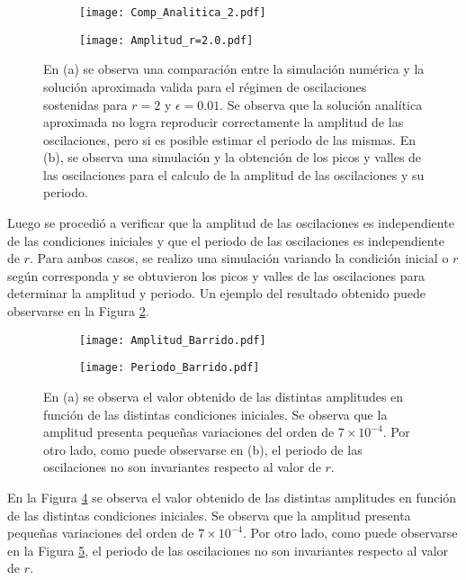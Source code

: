 \begin{figure}[h!]
    \centering
    \begin{subfigure}[b]{0.48\textwidth}
        \texttt{[image: Comp\_Analitica\_2.pdf]}
        \caption{}
        \label{02_Comp_Analitica}
    \end{subfigure}
    \hfill
    \begin{subfigure}[b]{0.48\textwidth}
        \texttt{[image: Amplitud\_r=2.0.pdf]}
        \caption{}
        \label{02_Picos}
    \end{subfigure}
    \caption{En (a) se observa una comparación entre la simulación numérica y la solución aproximada valida para el régimen de oscilaciones sostenidas para $r=2$ y $\epsilon=0.01$. Se observa que la solución analítica aproximada no logra reproducir correctamente la amplitud de las oscilaciones, pero si es posible estimar el periodo de las mismas. En (b), se observa una simulación y la obtención de los picos y valles de las oscilaciones para el calculo de la amplitud de las oscilaciones y su periodo.}
    \label{02_ejercicio_2}
\end{figure}

Luego se procedió a verificar que la amplitud de las oscilaciones es independiente de las condiciones iniciales y que el periodo de las oscilaciones es independiente de $r$. Para ambos casos, se realizo una simulación variando la condición inicial o $r$ según corresponda y se obtuvieron los picos y valles de las oscilaciones para determinar la amplitud y periodo. Un ejemplo del resultado obtenido puede observarse en la Figura \ref{02_Picos}.

\begin{figure}[h!]
    \centering
    \begin{subfigure}[b]{0.48\textwidth}
        \texttt{[image: Amplitud\_Barrido.pdf]}
        \caption{}
        \label{02_Barrido_CI}
    \end{subfigure}
    \hfill
    \begin{subfigure}[b]{0.48\textwidth}
        \texttt{[image: Periodo\_Barrido.pdf]}
        \caption{}
        \label{02_Barrido_r}
    \end{subfigure}
    \caption{En (a) se observa el valor obtenido de las distintas amplitudes en función de las distintas condiciones iniciales. Se observa que la amplitud presenta pequeñas variaciones del orden de $7\times 10^{-4}$. Por otro lado, como puede observarse en (b), el periodo de las oscilaciones no son invariantes respecto al valor de $r$.}
    \label{02_Resutados_Barridos}
\end{figure}

En la Figura \ref{02_Barrido_CI} se observa el valor obtenido de las distintas amplitudes en función de las distintas condiciones iniciales. Se observa que la amplitud presenta pequeñas variaciones del orden de $7\times 10^{-4}$. Por otro lado, como puede observarse en la Figura \ref{02_Barrido_r}, el periodo de las oscilaciones no son invariantes respecto al valor de $r$.